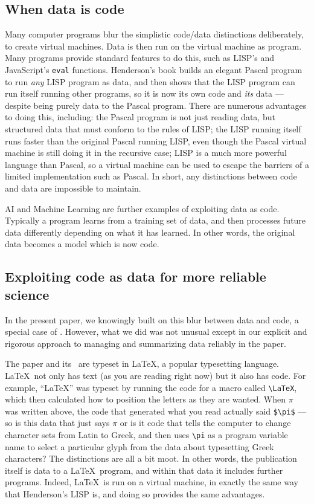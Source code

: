 \documentclass[10pt,a4paper]{article}
\begin{document}
\begin{change}
\subsection{When data is code}
{Many computer programs blur the simplistic code/data distinctions deliberately, to create virtual machines. Data is then run on the virtual machine as program. Many programs provide standard features to do this, such as LISP's and JavaScript's \texttt{eval} functions. Henderson's book \cite{henderson} builds an elegant Pascal program to run \emph{any\/} LISP program as data, and then shows that the LISP program can run itself running other programs, so it is now its own code and \emph{its\/} data --- despite being purely data to the Pascal program. There are numerous advantages to doing this, including: the Pascal program is not just reading data, but structured data that must conform to the rules of LISP; the LISP running itself runs faster than the original Pascal running LISP, even though the Pascal virtual machine is still doing it in the recursive case; LISP is a much more powerful language than Pascal, so a virtual machine can be used to escape the barriers of a limited implementation such as Pascal. In short, any distinctions between code and data are impossible to maintain.}

AI and Machine Learning are further examples of exploiting data as code. Typically a program learns from a training set of data, and then processes future data differently depending on what it has learned. In other words, the original data becomes a model which is now code.

\subsection{Exploiting code as data for more reliable science}
\end{change}\noindent
In the present paper, we knowingly built on this blur between data and code, a special case of \RAPstarp. However, what we did was not unusual except in our explicit and rigorous approach to managing and summarizing data reliably in the paper.

The paper and its \supplement\ are typeset in \LaTeX, a popular typesetting language. \LaTeX\ not only has text (as you are reading right now) but it also has code. For example, ``\LaTeX'' was typeset by running the code for a macro called \verb|\LaTeX|, which then calculated how to position the letters as they are wanted. When $\pi$ was written above, the code that generated what you read actually said \verb|$\pi$| --- so is this data that just says $\pi$ or is it code that tells the computer to change character sets from Latin to Greek, and then uses \verb|\pi| as a program variable name to select a particular glyph from the data about typesetting Greek characters? The distinctions are all a bit moot. In other words, the publication itself is data to a \LaTeX\ program, and within that data it includes further programs. Indeed, \LaTeX\ is run on a virtual machine, in exactly the same way that Henderson's LISP is, and doing so provides the same advantages.
\end{document}
